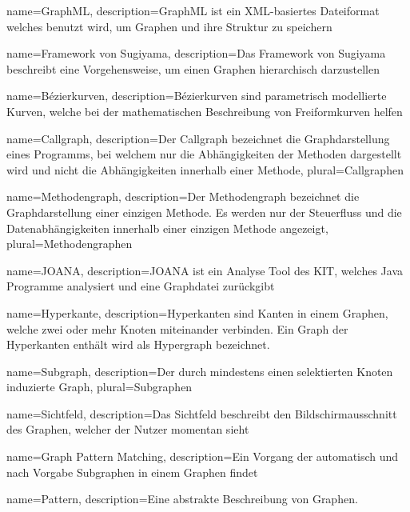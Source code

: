 {
  name=GraphML,
  description={GraphML ist ein XML-basiertes Dateiformat welches benutzt wird, um Graphen und ihre Struktur zu speichern}
}

{
  name=Framework von Sugiyama,
  description={Das Framework von Sugiyama beschreibt eine Vorgehensweise, um einen Graphen hierarchisch darzustellen}
}

{
  name=Bézierkurven,
  description={Bézierkurven sind parametrisch modellierte Kurven, welche bei der mathematischen Beschreibung von Freiformkurven helfen}
}

{
  name=Callgraph,
  description={Der Callgraph bezeichnet die Graphdarstellung eines Programms, bei welchem nur die Abhängigkeiten der Methoden dargestellt wird und nicht die Abhängigkeiten innerhalb einer Methode},
  plural=Callgraphen
}

{
  name=Methodengraph,
  description={Der Methodengraph bezeichnet die Graphdarstellung einer einzigen Methode. Es werden nur der Steuerfluss und die Datenabhängigkeiten innerhalb einer einzigen Methode angezeigt},
  plural=Methodengraphen
}

{
  name=JOANA,
  description={JOANA ist ein Analyse Tool des KIT, welches Java Programme analysiert und eine Graphdatei zurückgibt}
}

{
  name=Hyperkante,
  description={Hyperkanten sind Kanten in einem Graphen, welche zwei oder mehr Knoten miteinander verbinden. Ein Graph der Hyperkanten enthält wird als Hypergraph bezeichnet.}
}

{
  name=Subgraph,
  description={Der durch mindestens einen selektierten Knoten induzierte Graph},
  plural=Subgraphen
}

{
	name=Sichtfeld,
	description={Das Sichtfeld beschreibt den Bildschirmausschnitt des Graphen, welcher der Nutzer momentan sieht}
}

{
  name=Graph Pattern Matching,
  description={Ein Vorgang der automatisch und nach Vorgabe Subgraphen in einem Graphen findet}
}

{
  name=Pattern,
  description={Eine abstrakte Beschreibung von Graphen.}
}


